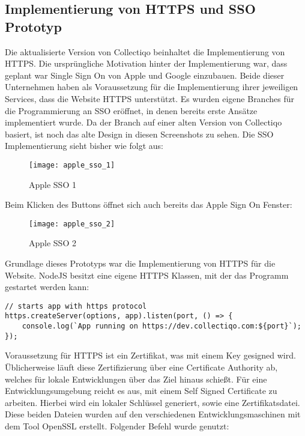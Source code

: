 \subsection{Implementierung von HTTPS und SSO Prototyp}\label{subsec:implementierung-von-https}

Die aktualisierte Version von Collectiqo beinhaltet die Implementierung von HTTPS.
Die ursprüngliche Motivation hinter der Implementierung war, dass geplant war Single Sign On von Apple und Google einzubauen.
Beide dieser Unternehmen haben als Voraussetzung für die Implementierung ihrer jeweiligen Services, dass die Website HTTPS unterstützt.
Es wurden eigene Branches für die Programmierung an SSO eröffnet, in denen bereits erste Ansätze implementiert wurde.
Da der Branch auf einer alten Version von Collectiqo basiert, ist noch das alte Design in diesen Screenshots zu sehen.
Die SSO Implementierung sieht bisher wie folgt aus:

\begin{figure}[h]
    \centering
    \texttt{[image: apple\_sso\_1]}
    \caption{Apple SSO 1}
    \label{fig:apple_sso_1}
\end{figure}

Beim Klicken des Buttons öffnet sich auch bereits das Apple Sign On Fenster:

\begin{figure}[h]
    \centering
    \texttt{[image: apple\_sso\_2]}
    \caption{Apple SSO 2}
    \label{fig:apple_sso_2}
\end{figure}

Grundlage dieses Prototyps war die Implementierung von HTTPS für die Website.
NodeJS besitzt eine eigene HTTPS Klassen, mit der das Programm gestartet werden kann:

\vspace{1em}
\lstset{language=JavaScript}
\begin{lstlisting}[label={lst:https}]
// starts app with https protocol
https.createServer(options, app).listen(port, () => {
    console.log(`App running on https://dev.collectiqo.com:${port}`);
});
\end{lstlisting}
\vspace{1em}

Voraussetzung für HTTPS ist ein Zertifikat, was mit einem Key gesigned wird.
Üblicherweise läuft diese Zertifizierung über eine Certificate Authority ab, welches für lokale Entwicklungen über das Ziel hinaus schießt.
Für eine Entwicklungsumgebung reicht es aus, mit einem Self Signed Certificate zu arbeiten.
Hierbei wird ein lokaler Schlüssel generiert, sowie eine Zertifikatsdatei.
Diese beiden Dateien wurden auf den verschiedenen Entwicklungsmaschinen mit dem Tool OpenSSL erstellt.
Folgender Befehl wurde genutzt:

